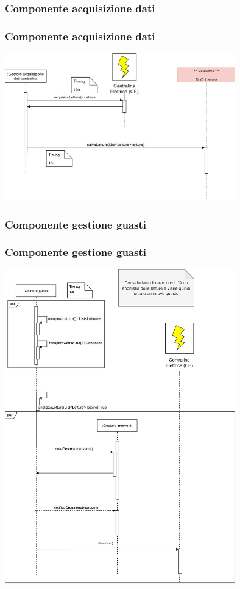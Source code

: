\documentclass{beamer}
\begin{document}
\begin{frame}
	\subsubsection{Componente acquisizione dati}
	\frametitle{Componente acquisizione dati}
		\begin{center}
			\includegraphics[width=0.75\textwidth, height=0.75\textheight, keepaspectratio=true]{acquisizione_dati.png}
		\end{center}
\end{frame}

\begin{frame}
	\subsubsection{Componente gestione guasti}
	\frametitle{Componente gestione guasti}
	\begin{center}
		\includegraphics[width=0.75\textwidth, height=0.75\textheight, keepaspectratio=true]{gestione_guasti.png}
	\end{center}
\end{frame}
\end{document}
